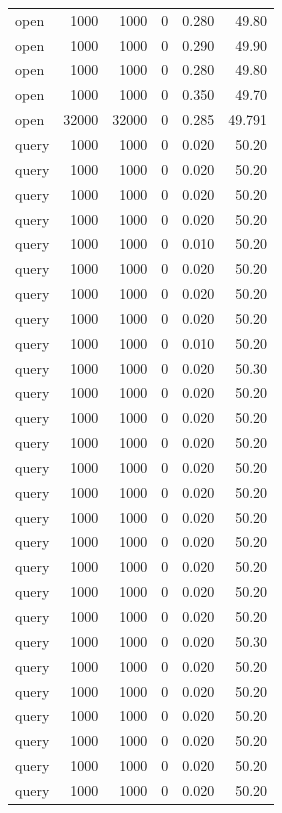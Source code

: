 \begin{table}[ht]
\begin{tabular}{lrrrrr}
open & 1000 & 1000 & 0 & 0.280 & 49.80 \\
open & 1000 & 1000 & 0 & 0.290 & 49.90 \\
open & 1000 & 1000 & 0 & 0.280 & 49.80 \\
open & 1000 & 1000 & 0 & 0.350 & 49.70 \\
open & 32000 & 32000 & 0 & 0.285 & 49.791 \\
\midrule
query & 1000 & 1000 & 0 & 0.020 & 50.20 \\
query & 1000 & 1000 & 0 & 0.020 & 50.20 \\
query & 1000 & 1000 & 0 & 0.020 & 50.20 \\
query & 1000 & 1000 & 0 & 0.020 & 50.20 \\
query & 1000 & 1000 & 0 & 0.010 & 50.20 \\
query & 1000 & 1000 & 0 & 0.020 & 50.20 \\
query & 1000 & 1000 & 0 & 0.020 & 50.20 \\
query & 1000 & 1000 & 0 & 0.020 & 50.20 \\
query & 1000 & 1000 & 0 & 0.010 & 50.20 \\
query & 1000 & 1000 & 0 & 0.020 & 50.30 \\
query & 1000 & 1000 & 0 & 0.020 & 50.20 \\
query & 1000 & 1000 & 0 & 0.020 & 50.20 \\
query & 1000 & 1000 & 0 & 0.020 & 50.20 \\
query & 1000 & 1000 & 0 & 0.020 & 50.20 \\
query & 1000 & 1000 & 0 & 0.020 & 50.20 \\
query & 1000 & 1000 & 0 & 0.020 & 50.20 \\
query & 1000 & 1000 & 0 & 0.020 & 50.20 \\
query & 1000 & 1000 & 0 & 0.020 & 50.20 \\
query & 1000 & 1000 & 0 & 0.020 & 50.20 \\
query & 1000 & 1000 & 0 & 0.020 & 50.20 \\
query & 1000 & 1000 & 0 & 0.020 & 50.30 \\
query & 1000 & 1000 & 0 & 0.020 & 50.20 \\
query & 1000 & 1000 & 0 & 0.020 & 50.20 \\
query & 1000 & 1000 & 0 & 0.020 & 50.20 \\
query & 1000 & 1000 & 0 & 0.020 & 50.20 \\
query & 1000 & 1000 & 0 & 0.020 & 50.20 \\
query & 1000 & 1000 & 0 & 0.020 & 50.20 \\

\end{tabular}
\end{table}
